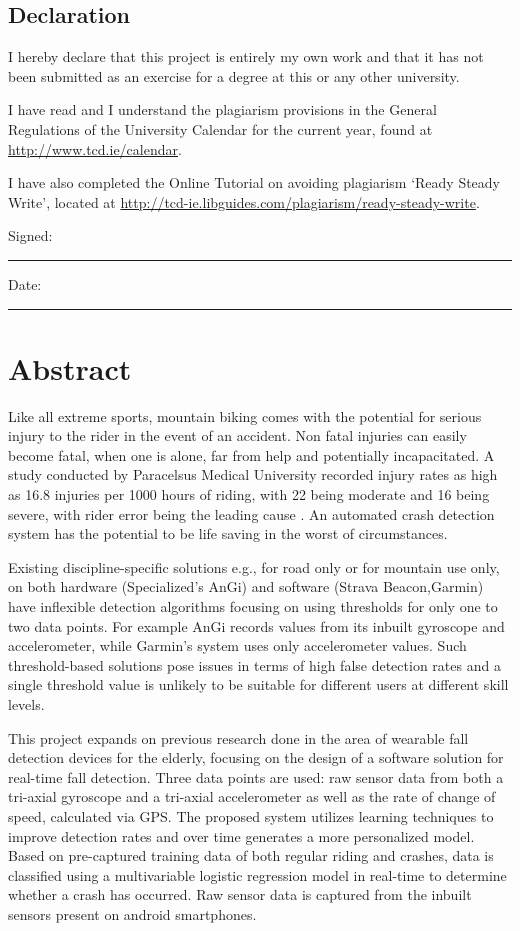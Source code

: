 \documentclass[a4paper,oneside,12pt]{book}
\title{\thesistitle}
\author{\authorname}
\begin{document}

\section*{\Huge{Declaration}}
\vspace{1cm}
I hereby declare that this project is entirely my own work and that it has not been submitted as an exercise for a degree at this or any other university.

\vspace{1cm}
I have read and I understand the plagiarism provisions in the General Regulations of the University Calendar for the current year, found at \url{http://www.tcd.ie/calendar}.
\vspace{1cm}

I have also completed the Online Tutorial on avoiding plagiarism `Ready Steady Write', located at
\url{http://tcd-ie.libguides.com/plagiarism/ready-steady-write}.
\vspace{3cm}

Signed:~\rule{5cm}{0.3pt}\hfill Date:~\rule{5cm}{0.3pt}

\chapter*{Abstract}
Like all extreme sports, mountain biking comes with the potential for serious injury to the rider in the event of an accident. Non fatal injuries can easily become fatal, when one is alone, far from help and potentially incapacitated. A study conducted by Paracelsus Medical University recorded injury rates as high as 16.8 injuries per 1000 hours of riding, with 22 being moderate and 16 being severe, with rider error being the leading cause \cite{studyOfMTBInjuries}. An automated crash detection system has the potential to be life saving in the worst of circumstances.

Existing discipline-specific solutions e.g., for road only or for mountain use only, on both hardware (Specialized’s AnGi) and software (Strava Beacon,Garmin) have inflexible detection algorithms focusing on using thresholds for only one to two data points. For example AnGi records values from its inbuilt gyroscope and accelerometer, while Garmin’s system uses only accelerometer values. Such threshold-based solutions pose issues in terms of high false detection rates and a single threshold value is unlikely to be suitable for different users at different skill levels.
  
 This project expands on previous research done in the area of wearable fall detection devices for the elderly, focusing on the design of a software solution for real-time fall detection. Three data points are used: raw sensor data from both a tri-axial gyroscope and a tri-axial accelerometer as well as the rate of change of speed, calculated via GPS. The proposed system utilizes learning techniques to improve detection rates and over time generates a more personalized model. Based on pre-captured training data of both regular riding and crashes, data is classified using a multivariable logistic regression model in real-time to determine whether a crash has occurred. Raw sensor data is captured from the inbuilt sensors present on android smartphones.
\end{document}
